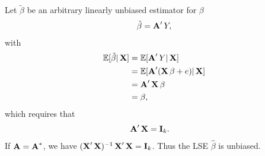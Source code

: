 \documentclass[UTF8,a4paper,10pt]{article}
\begin{document}
\begin{solution}
    Let \(\tilde{\beta}\) be an arbitrary linearly unbiased estimator for \(\beta\)
    \begin{equation*}
      \begin{aligned}
        \tilde{\beta}=\A^{\prime}Y,
      \end{aligned}
    \end{equation*}
    with
    \begin{equation*}
      \begin{aligned}
        \E[\tilde{\beta}|\X]&=\E[\A^{\prime}Y|\X]\\
        &=\E[\A^{\prime}(\X\beta+e)|\X]\\
        &=\A^{\prime}\X\beta\\
        &=\beta,
      \end{aligned}
    \end{equation*}
    which requires that
    \begin{equation*}
      \begin{aligned}
        \A^{\prime}\X&=\mathbf{I}_k.
      \end{aligned}
    \end{equation*}
    If \(\A = \A^*\), we have \((\X'\X)^{-1}\X'\X = \mathbf{I}_k\). Thus the LSE \(\hat{\beta}\) is unbiased.
    

\end{solution}
\end{document}
